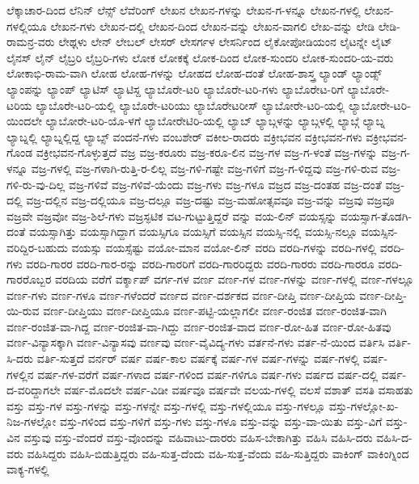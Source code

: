 {ಲೆಕ್ಕಾಚಾರ-ದಿಂದ
ಲೆನಿನ್
ಲೆನ್ಸ್
ಲೆವೆರಿಂಗ್
ಲೇಖನ
ಲೇಖನ-ಗಳನ್ನು
ಲೇಖನ-ಗ-ಳನ್ನೂ
ಲೇಖನ-ಗಳಲ್ಲಿ
ಲೇಖನ-ಗಳಲ್ಲಿಯೂ
ಲೇಖನ-ಗಳು
ಲೇಖನ-ದಲ್ಲಿ
ಲೇಖನ-ದಿಂದ
ಲೇಖನ-ವನ್ನು
ಲೇಖನ-ವಾಗಲಿ
ಲೇಖ-ವನ್ನು
ಲೇಡಿ
ಲೇಡಿ-ರಾಮನ್ರ-ವರು
ಲೇಥ್ಗಳು
ಲೇನ್
ಲೇಬಲ್
ಲೇಸರ್
ಲೇಸರ್ಗಳ
ಲೇಸರ್ನಿಂದ
ಲೈಕೋಪೋಡಿಯಂನ
ಲೈಟನ್ನೇ
ಲೈಟ್
ಲೈನಸ್
ಲೈನ್
ಲೈಬ್ರರಿ
ಲೈಬ್ರರಿ-ಗಳು
ಲೋಕ
ಲೋಕಕ್ಕೆ
ಲೋಕ-ದಿಂದ
ಲೋಕ-ಸುಂದರಿ
ಲೋಕ-ಸುಂದರಿ-ಯ-ವರು
ಲೋಕಾಭಿ-ರಾಮ-ವಾಗಿ
ಲೋಹ
ಲೋಹ-ಗಳನ್ನು
ಲೋಹದ
ಲೋಹ-ದಂತೆ
ಲೋಹ-ಶಾಸ್ತ್ರ
ಲ್ಯಾಂಡ್
ಲ್ಯಾಂಡ್ಸ್
ಲ್ಯಾಂಪನ್ನು
ಲ್ಯಾಂಪ್
ಲ್ಯಾಟಿಸ್
ಲ್ಯಾಟಿಸ್ದ
ಲ್ಯಾಬೊರೇ-ಟರಿ
ಲ್ಯಾಬೊರೇ-ಟರಿ-ಗಳು
ಲ್ಯಾಬೊರೇಟ-ರಿಗೆ
ಲ್ಯಾಬೊರೇ-ಟರಿಯ
ಲ್ಯಾಬೊರೇ-ಟರಿ-ಯಲ್ಲಿ
ಲ್ಯಾಬೊರೇ-ಟರಿಯು
ಲ್ಯಾಬೊರೇಟರೀಸ್
ಲ್ಯಾಬೋರೇ-ಟರಿ-ಯಲ್ಲಿ
ಲ್ಯಾಬೋರೇ-ಟರಿ-ಯಿಂದಲೇ
ಲ್ಯಾಬೋರೇ-ಟರಿ-ಯೊ-ಳಗೆ
ಲ್ಯಾಬೋರೇಟಿರಿ-ಯಲ್ಲಿ
ಲ್ಯಾಬ್
ಲ್ಯಾಬ್ಗಳನ್ನು
ಲ್ಯಾಬ್ಗಳಲ್ಲಿ
ಲ್ಯಾಬ್ಗೆ
ಲ್ಯಾಬ್ನ
ಲ್ಯಾಬ್ನಲ್ಲಿ
ಲ್ಯಾಬ್ನಲ್ಲಿದ್ದ
ಲ್ಯಾಬ್ಸ್
ವಂದನೆ-ಗಳು
ವಂಬಶೇರ್
ವಕೀಲ-ರಾದರು
ವಕ್ರೀಭವನ
ವಕ್ರೀಭವನ-ಗಳು
ವಕ್ರೀಭವನ-ಗೊಂಡ
ವಕ್ರೀಭವನ-ಗೊಳ್ಳುತ್ತದೆ
ವಜ್ರ
ವಜ್ರ-ಕರೂರು
ವಜ್ರ-ಕರೂ-ಲಿನ
ವಜ್ರ-ಗಳ
ವಜ್ರ-ಗ-ಳಂತೆ
ವಜ್ರ-ಗಳನ್ನು
ವಜ್ರ-ಗ-ಳನ್ನೂ
ವಜ್ರ-ಗಳಲ್ಲಿ
ವಜ್ರ-ಗಳಾಗಿ-ರುತ್ತಿ-ರ-ಲಿಲ್ಲ
ವಜ್ರ-ಗಳಿ-ಗಷ್ಟೇ
ವಜ್ರ-ಗಳಿಗೆ
ವಜ್ರ-ಗ-ಳಿದ್ದವು
ವಜ್ರ-ಗಳಿ-ರುವ
ವಜ್ರ-ಗಳಿ-ರು-ವು-ದಿಲ್ಲ
ವಜ್ರ-ಗಳಿವೆ
ವಜ್ರ-ಗಳಿವೆ-ಯೆಂದು
ವಜ್ರ-ಗಳು
ವಜ್ರ-ಗಳೂ
ವಜ್ರದ
ವಜ್ರ-ದಂತಹ
ವಜ್ರ-ದಂತೆ
ವಜ್ರ-ದಲ್ಲಿ
ವಜ್ರ-ದಲ್ಲಿನ
ವಜ್ರ-ದಲ್ಲಿಯೂ
ವಜ್ರ-ದಲ್ಲೂ
ವಜ್ರ-ದಷ್ಟು
ವಜ್ರ-ಮಹೋತ್ಸವವೂ
ವಜ್ರ-ವನ್ನು
ವಜ್ರವು
ವಜ್ರವೂ
ವಜ್ರವೇ
ವಜ್ರವೋ
ವಜ್ರ-ಶಿಲೆ-ಗಳು
ವಜ್ರಸ್ಫಟಿಕ
ವಟ-ಗುಟ್ಟುತ್ತಿದ್ದರೆ
ವನ್ನು
ವಯ-ಲಿನ್
ವಯಸ್ಸನ್ನು
ವಯಸ್ಸಾಗ-ತೊಡಗಿ-ದಂತೆ
ವಯಸ್ಸಾಗಿತ್ತು
ವಯಸ್ಸಾಗಿದ್ದಾಗ
ವಯಸ್ಸಿಗೂ
ವಯಸ್ಸಿಗೆ
ವಯಸ್ಸಿನ
ವಯಸ್ಸಿ-ನಲ್ಲಿ
ವಯಸ್ಸಿ-ನಲ್ಲೂ
ವಯಸ್ಸಿನ-ವರಿದ್ದಿರ-ಬಹುದು
ವಯಸ್ಸು
ವಯಸ್ಸೆಷ್ಟು
ವಯೋ-ಮಾನ
ವಯೋ-ಲಿನ್
ವರದಿ
ವರದಿ-ಗಳನ್ನು
ವರದಿ-ಗಳಲ್ಲಿ
ವರದಿ-ಗಳು
ವರದಿ-ಗಾರರ
ವರದಿ-ಗಾರ-ರನ್ನು
ವರದಿ-ಗಾರರಿಗೆ
ವರದಿ-ಗಾರರಿದ್ದರು
ವರದಿ-ಗಾರರು
ವರದಿ-ಗಾರರೂ
ವರದಿ-ಗಾರರೊಬ್ಬರ
ವರದಿಯ
ವರೆಗೆ
ವರ್ಕ್ಶಾಪ್
ವರ್ಗ-ಗಳ
ವರ್ಣ
ವರ್ಣ-ಗಳ
ವರ್ಣ-ಗಳನ್ನು
ವರ್ಣ-ಗಳಲ್ಲಿ
ವರ್ಣ-ಗಳಲ್ಲೂ
ವರ್ಣ-ಗಳು
ವರ್ಣ-ಗಳೂ
ವರ್ಣ-ಗಳೆಂದರೆ
ವರ್ಣದ
ವರ್ಣ-ದರ್ಶಕದ
ವರ್ಣ-ದೀಪ್ತಿ
ವರ್ಣ-ದೀಪ್ತಿಯ
ವರ್ಣ-ದೀಪ್ತಿ-ಯಿ-ರುವ
ವರ್ಣ-ದೀಪ್ತಿಯು
ವರ್ಣ-ದೀಪ್ತಿಯೂ
ವರ್ಣ-ಪಟ್ಟಿ-ಯಲ್ಲಾಗಲೀ
ವರ್ಣ-ರಂಜಿತ
ವರ್ಣ-ರಂಜಿತ-ವಾಗಿ
ವರ್ಣ-ರಂಜಿತ-ವಾ-ಗಿದ್ದ
ವರ್ಣ-ರಂಜಿತ-ವಾ-ಗಿದ್ದು
ವರ್ಣ-ರಂಜಿತ-ವಾದ
ವರ್ಣ-ರೋ-ಹಿತ
ವರ್ಣ-ರೋ-ಹಿತವು
ವರ್ಣ-ವಿನ್ಯಾಸಕ್ಕಾಗಿ
ವರ್ಣ-ವಿನ್ಯಾಸವು
ವರ್ಣವು
ವರ್ಣ-ವೈವಿದ್ಯ-ಗಳು
ವರ್ತನೆ-ಗಳು
ವರ್ತ-ನೆ-ಯಿಂದ
ವರ್ತಿಸಿ
ವರ್ತಿ-ಸಿ-ದರು
ವರ್ತಿ-ಸುತ್ತದೆ
ವರ್ನರ್
ವರ್ಷ
ವರ್ಷ-ಕಾಲ
ವರ್ಷಕ್ಕೆ
ವರ್ಷ-ಗಳ
ವರ್ಷ-ಗಳನ್ನು
ವರ್ಷ-ಗಳಲ್ಲಿ
ವರ್ಷ-ಗಳಲ್ಲಿನ
ವರ್ಷ-ಗಳ-ವರೆಗೆ
ವರ್ಷ-ಗಳಾದ
ವರ್ಷ-ಗಳಿಂದ
ವರ್ಷ-ಗಳಿಗೂ
ವರ್ಷ-ಗಳು
ವರ್ಷದ
ವರ್ಷ-ದಲ್ಲಿ
ವರ್ಷ-ದ-ವರಿದ್ದಾಗಲೇ
ವರ್ಷ-ಮೊದಲೇ
ವರ್ಷ-ವಿಡೀ
ವರ್ಷವೂ
ವರ್ಷವೇ
ವಲಯ-ಗಳಲ್ಲಿ
ವಲಸೆ
ವಶಾತ್
ವಸತಿ
ವಸಾಹತು
ವಸ್ತು
ವಸ್ತು-ಗಳ
ವಸ್ತು-ಗಳನ್ನು
ವಸ್ತು-ಗಳನ್ನೇ
ವಸ್ತು-ಗಳಲ್ಲಿ
ವಸ್ತು-ಗಳಲ್ಲಿಯೂ
ವಸ್ತು-ಗಳಲ್ಲೂ
ವಸ್ತು-ಗಳಲ್ಲೋ-ಖ-ನಿಜ-ಗಳಲ್ಲೋ
ವಸ್ತು-ಗಳಿಂದ
ವಸ್ತು-ಗಳಿಗೆ
ವಸ್ತು-ಗಳು
ವಸ್ತು-ಗಳೂ
ವಸ್ತು-ವನ್ನು
ವಸ್ತು-ವಾ-ಯಿತು
ವಸ್ತು-ವಿಗೆ
ವಸ್ತು-ವಿನ
ವಸ್ತುವು
ವಸ್ತು-ವೆಂದರೆ
ವಸ್ತು-ವೊಂದನ್ನು
ವಹಿವಾಟು-ದಾರರು
ವಹಿಸ-ಬೇಕಾಗಿತ್ತು
ವಹಿಸಿ
ವಹಿಸಿ-ದರು
ವಹಿಸಿ-ದ-ವರು
ವಹಿಸಿದ್ದರು
ವಹಿಸಿ-ಬಿಡುತ್ತಿದ್ದರು
ವಹಿ-ಸುತ್ತ-ದೆಂದು
ವಹಿ-ಸುತ್ತ-ವೆಂದು
ವಹಿ-ಸುತ್ತಿದ್ದರು
ವಾಕಿಂಗ್
ವಾಕಿಂಗ್ನಿಂದ
ವಾಕ್ಯ-ಗಳಲ್ಲಿ
}
